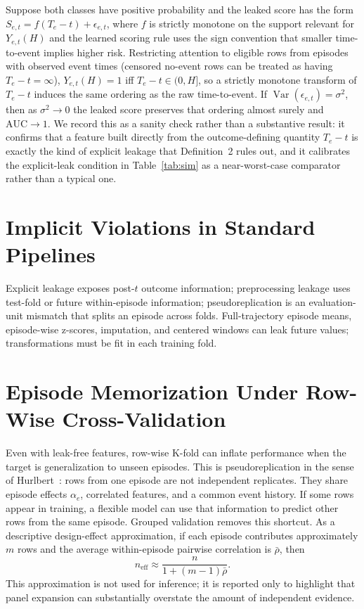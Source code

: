 \documentclass[runningheads]{llncs}
\newcommand{\1}{\mathbf{1}}
\newcommand{\Var}{\operatorname{Var}}
\begin{document}
\begin{remark}\label{thm:leakage}
Suppose both classes have positive probability and the leaked score has the form $S_{e,t} = f(T_e - t) + \epsilon_{e,t}$, where $f$ is strictly monotone on the support relevant for $Y_{e,t}(H)$ and the learned scoring rule uses the sign convention that smaller time-to-event implies higher risk. Restricting attention to eligible rows from episodes with observed event times (censored no-event rows can be treated as having $T_e - t = \infty$), $Y_{e,t}(H)=1$ iff $T_e - t \in (0,H]$, so a strictly monotone transform of $T_e - t$ induces the same ordering as the raw time-to-event. If $\Var(\epsilon_{e,t}) = \sigma^2$, then as $\sigma^2 \to 0$ the leaked score preserves that ordering almost surely and $\mathrm{AUC} \to 1$. We record this as a sanity check rather than a substantive result: it confirms that a feature built directly from the outcome-defining quantity $T_e - t$ is exactly the kind of explicit leakage that Definition~2 rules out, and it calibrates the explicit-leak condition in Table~\ref{tab:sim} as a near-worst-case comparator rather than a typical one.
\end{remark}

\section{Implicit Violations in Standard Pipelines}\label{sec:implicit}

Explicit leakage exposes post-$t$ outcome information; preprocessing leakage uses test-fold or future within-episode information; pseudoreplication is an evaluation-unit mismatch that splits an episode across folds. Full-trajectory episode means, episode-wise z-scores, imputation, and centered windows can leak future values; transformations must be fit in each training fold.

\section{Episode Memorization Under Row-Wise Cross-Validation}\label{sec:pseudo}

Even with leak-free features, row-wise K-fold can inflate performance when the target is generalization to unseen episodes. This is pseudoreplication in the sense of Hurlbert~\cite{hurlbert1984}: rows from one episode are not independent replicates. They share episode effects $\alpha_e$, correlated features, and a common event history. If some rows appear in training, a flexible model can use that information to predict other rows from the same episode. Grouped validation removes this shortcut. As a descriptive design-effect approximation, if each episode contributes approximately $m$ rows and the average within-episode pairwise correlation is $\bar{\rho}$, then
\[
n_{\text{eff}} \approx \frac{n}{1 + (m-1)\bar{\rho}}.
\]
This approximation is not used for inference; it is reported only to highlight that panel expansion can substantially overstate the amount of independent evidence.
\end{document}

